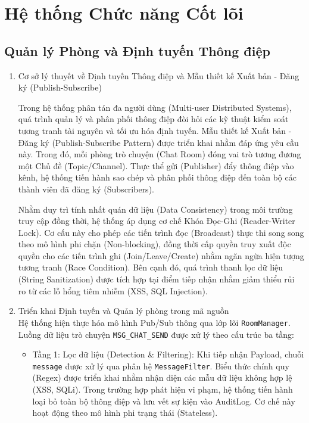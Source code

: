 \section{Hệ thống Chức năng Cốt lõi}

\subsection{Quản lý Phòng và Định tuyến Thông điệp}

\begin{enumerate}
    \item Cơ sở lý thuyết về Định tuyến Thông điệp và Mẫu thiết kế Xuất bản - Đăng ký (Publish-Subscribe)
    
    Trong hệ thống phân tán đa người dùng (Multi-user Distributed Systems), quá trình quản lý và phân phối thông điệp đòi hỏi các kỹ thuật kiểm soát tương tranh tài nguyên và tối ưu hóa định tuyến. Mẫu thiết kế Xuất bản - Đăng ký (Publish-Subscribe Pattern) được triển khai nhằm đáp ứng yêu cầu này. Trong đó, mỗi phòng trò chuyện (Chat Room) đóng vai trò tương đương một Chủ đề (Topic/Channel). Thực thể gửi (Publisher) đẩy thông điệp vào kênh, hệ thống tiến hành sao chép và phân phối thông điệp đến toàn bộ các thành viên đã đăng ký (Subscribers).
    
    Nhằm duy trì tính nhất quán dữ liệu (Data Consistency) trong môi trường truy cập đồng thời, hệ thống áp dụng cơ chế Khóa Đọc-Ghi (Reader-Writer Lock). Cơ cấu này cho phép các tiến trình đọc (Broadcast) thực thi song song theo mô hình phi chặn (Non-blocking), đồng thời cấp quyền truy xuất độc quyền cho các tiến trình ghi (Join/Leave/Create) nhằm ngăn ngừa hiện tượng tương tranh (Race Condition). Bên cạnh đó, quá trình thanh lọc dữ liệu (String Sanitization) được tích hợp tại điểm tiếp nhận nhằm giảm thiểu rủi ro từ các lỗ hổng tiêm nhiễm (XSS, SQL Injection).

    \item Triển khai Định tuyến và Quản lý phòng trong mã nguồn \\
    Hệ thống hiện thực hóa mô hình Pub/Sub thông qua lớp lõi \texttt{RoomManager}. Luồng dữ liệu trò chuyện \texttt{MSG\_CHAT\_SEND} được xử lý theo cấu trúc ba tầng:
    
    \begin{itemize}[label={-}]
        \item Tầng 1: Lọc dữ liệu (Detection \& Filtering): Khi tiếp nhận Payload, chuỗi \texttt{message} được xử lý qua phân hệ \texttt{MessageFilter}. Biểu thức chính quy (Regex) được triển khai nhằm nhận diện các mẫu dữ liệu không hợp lệ (XSS, SQLi). Trong trường hợp phát hiện vi phạm, hệ thống tiến hành loại bỏ toàn bộ thông điệp và lưu vết sự kiện vào AuditLog. Cơ chế này hoạt động theo mô hình phi trạng thái (Stateless).
        

\end{itemize}
\end{enumerate}
